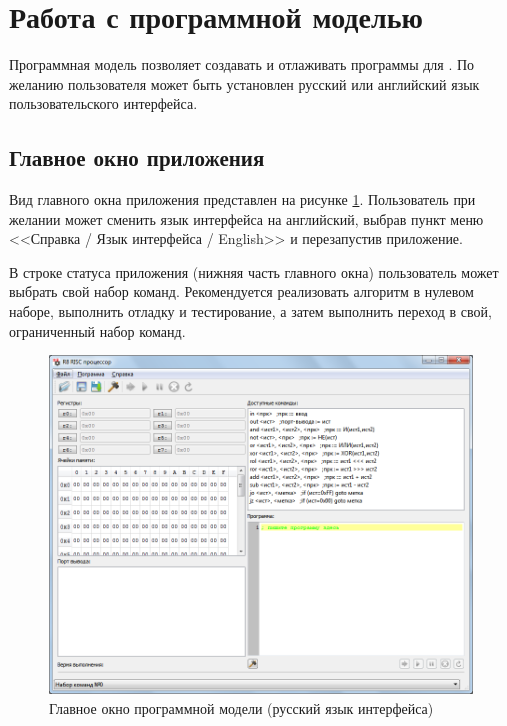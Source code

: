 \section{Работа с программной моделью \MyProc}
\label{ch::asm}


Программная модель позволяет создавать и отлаживать программы для \MyProc. По желанию пользователя может быть установлен русский или английский язык пользовательского интерфейса.

\subsection{Главное окно приложения}

Вид главного окна приложения представлен на рисунке \ref{fig:asm:r8asmWindow}. Пользователь при желании может сменить язык интерфейса на английский, выбрав пункт меню <<Справка / Язык интерфейса / English>> и перезапустив приложение.

В строке статуса приложения (нижняя часть главного окна) пользователь может выбрать свой набор команд. Рекомендуется реализовать алгоритм в нулевом наборе, выполнить отладку и тестирование, а затем выполнить переход в свой, ограниченный набор команд.

\begin{figure}
    \centering
    \includegraphics[width=\textwidth]{fig/r8asmWindow}
    \caption{Главное окно программной модели {\MyProc} (русский язык интерфейса)}\label{fig:asm:r8asmWindow}
\end{figure}

